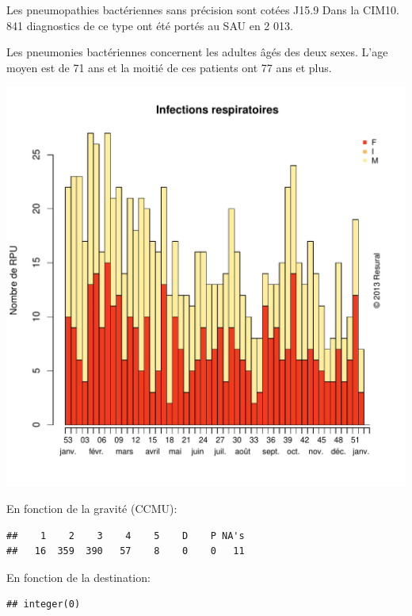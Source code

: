 \documentclass[12pt,english,french,twoside]{book}\usepackage[]{graphicx}\usepackage[]{color}
\makeatletter
\def\maxwidth{ %
  \ifdim\Gin@nat@width>\linewidth
    \linewidth
  \else
    \Gin@nat@width
  \fi
}
\newenvironment{kframe}{%
 \def\at@end@of@kframe{}%
 \ifinner\ifhmode%
  \def\at@end@of@kframe{\end{minipage}}%
  \begin{minipage}{\columnwidth}%
 \fi\fi%
 \def\FrameCommand##1{\hskip\@totalleftmargin \hskip-\fboxsep
 \colorbox{shadecolor}{##1}\hskip-\fboxsep
     \hskip-\linewidth \hskip-\@totalleftmargin \hskip\columnwidth}%
 \MakeFramed {\advance\hsize-\width
   \@totalleftmargin\z@ \linewidth\hsize
   \@setminipage}}%
 {\par\unskip\endMakeFramed%
 \at@end@of@kframe}
\newenvironment{knitrout}{}{} %
\makeatother
\begin{document}
Les pneumopathies bactériennes sans précision sont cotées J15.9 Dans la CIM10.
841 diagnostics de ce type ont été portés au SAU en 2 013.

Les pneumonies bactériennes concernent les adultes âgés des deux sexes. L'age moyen est de 71 ans et la moitié de ces patients ont 77 ans et plus.

\begin{knitrout}
\color{fgcolor}
\includegraphics[width=\maxwidth]{figure/pneumo} 

\end{knitrout}


En fonction de la gravité (CCMU):
\begin{knitrout}
\color{fgcolor}\begin{kframe}
\begin{verbatim}
##    1    2    3    4    5    D    P NA's 
##   16  359  390   57    8    0    0   11
\end{verbatim}
\end{kframe}
\end{knitrout}


En fonction de la destination:
\begin{knitrout}
\color{fgcolor}\begin{kframe}
\begin{verbatim}
## integer(0)
\end{verbatim}
\end{kframe}
\end{knitrout}
\end{document}
